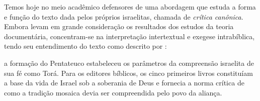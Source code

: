 \documentclass[
    article,            %
	12pt,				%
	oneside,			%
	a4paper,			%
	english,			%
	french,				%
	spanish,			%
	brazil				%
	]{abntex2}
\begin{document}
Temos hoje no meio acadêmico defensores de uma abordagem que estuda a forma e função do texto dada pelos próprios israelitas, chamada de \emph{crítica canônica}. Embora levam em grande consideração os resultados dos estudos da teoria documentária, concentram-se na interpretação intertextual e exegese intrabíblica, tendo seu entendimento do texto como descrito por :
\begin{citacao}
a formação do Pentateuco estabeleceu os parâmetros da compreensão israelita de sua fé como Torá. Para os editores bíblicos, os cinco primeiros livros constituíam a base da vida de Israel sob a soberania de Deus e fornecia a norma crítica de como a tradição mosaica devia ser compreendida pelo povo da aliança.\cite{LASOR}
\end{citacao}

\pagebreak

\end{document}

